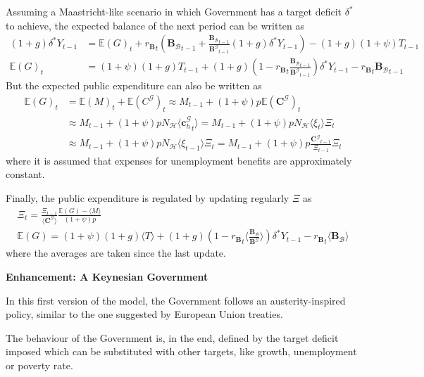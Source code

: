 \documentclass[a4paper, headings=standardclasses]{scrartcl}
\newenvironment{enh}[1][]{\begin{framed}\noindent\textbf{Enhancement: #1}\par}{\end{framed}}
\begin{document}
Assuming a Maastricht-like scenario in which Government has a target deficit $\delta^*$ to achieve, the expected balance of the next period can be written as
\begin{align*}
    (1+g) \delta^* Y_{t-1} & =  {\mathbb{E}(G)}_t + {r_\mathbf{B}}_t ({\mathbf{B}_\mathcal{B}}_{t-1} + \frac{{\mathbf{B}_\mathcal{B}}_{t-1}}{{\mathbf{B}^\mathcal{G}}_{t-1}} (1+g) \delta^* Y_{t-1}) - (1+g)(1+\psi) T_{t-1} \\
    \mathbb{E}(G)_t        & = (1+\psi)(1+g) T_{t-1} + (1+g)(1-{r_\mathbf{B}}_t \frac{{\mathbf{B}_\mathcal{B}}_{t-1}}{{\mathbf{B}^\mathcal{G}}_{t-1}})\delta^* Y_{t-1} - {r_\mathbf{B}}_t {\mathbf{B}_\mathcal{B}}_{t-1}
\end{align*}
But the expected public expenditure can also be written as
\begin{align*}
    \mathbb{E}(G)_t & = \mathbb{E}(M)_t + \mathbb{E}(C^\mathcal{G})_t \approx M_{t-1} + (1+\psi)p\mathbb{E}(\mathbf{C}^\mathcal{G})_t                                          \\
                    & \approx M_{t-1} + (1+\psi) p N_\mathcal{H} \langle {\mathbf{c}^\mathcal{G}_h}_t \rangle = M_{t-1} + (1+\psi) p N_\mathcal{H} \langle \xi_t \rangle \Xi_t \\
                    & \approx M_{t-1} + (1+\psi) p N_\mathcal{H} \langle \xi_{t-1} \rangle \Xi_t = M_{t-1} + (1+\psi) p \frac{{\mathbf{C}^\mathcal{G}}_{t-1}}{\Xi_{t-1}} \Xi_t
\end{align*}
where it is assumed that expenses for unemployment benefits are approximately constant.

Finally, the public expenditure is regulated by updating regularly $\Xi$ as
\begin{gather*}
    \Xi_t          = \frac{\Xi_{t-1}}{\langle {\mathbf{C}^\mathcal{G}} \rangle} \frac{\mathbb{E}(G) - \langle M \rangle}{(1+\psi)p}                                                                                       \\
    \mathbb{E}(G)  = (1+\psi)(1+g) \langle T \rangle + (1+g)(1-{r_\mathbf{B}}_t \langle \frac{{\mathbf{B}_\mathcal{B}}}{{\mathbf{B}^\mathcal{G}}} \rangle)\delta^* Y_{t-1} - {r_\mathbf{B}}_t \langle{\mathbf{B}_\mathcal{B}}\rangle
\end{gather*}
where the averages are taken since the last update.

\begin{enh}[A Keynesian Government]
    In this first version of the model, the Government follows an austerity-inspired policy, similar to the one suggested by European Union treaties.

    The behaviour of the Government is, in the end, defined by the target deficit imposed which can be substituted with other targets, like growth, unemployment or poverty rate.
\end{enh}
\end{document}

